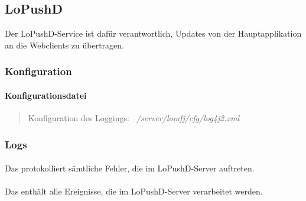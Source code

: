 
\subsection{LoPushD}

Der LoPushD-Service ist dafür verantwortlich, Updates von der Hauptapplikation an die Webclients zu übertragen.

\subsubsection{Konfiguration}

\paragraph{Konfigurationsdatei}
\vspace{0.5em}
\begin{quote}
Konfiguration des Loggings: \textit{~/server/lomfj/cfg/log4j2.xml}
\end{quote}

\subsubsection{Logs}

\paragraph{\pushdErrorLog}
Das \texttt{\pushdErrorLog} protokolliert sämtliche Fehler, die im LoPushD-Server auftreten.

\paragraph{\pushdServerLog}
Das \texttt{\pushdServerLog} enthält alle Ereignisse, die im LoPushD-Server verarbeitet werden.
